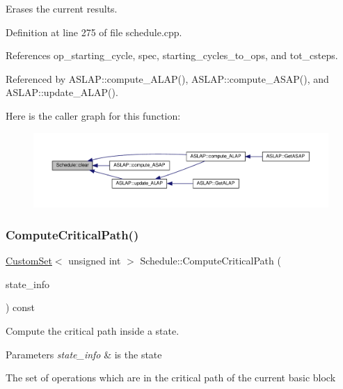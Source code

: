 Erases the current results. 



Definition at line 275 of file schedule.\+cpp.



References op\+\_\+starting\+\_\+cycle, spec, starting\+\_\+cycles\+\_\+to\+\_\+ops, and tot\+\_\+csteps.



Referenced by A\+S\+L\+A\+P\+::compute\+\_\+\+A\+L\+A\+P(), A\+S\+L\+A\+P\+::compute\+\_\+\+A\+S\+A\+P(), and A\+S\+L\+A\+P\+::update\+\_\+\+A\+L\+A\+P().

Here is the caller graph for this function\+:
\nopagebreak
\begin{figure}[H]
\begin{center}
\leavevmode
\includegraphics[width=350pt]{df/d61/classSchedule_aa94b33ccedaa82177f6a78b3fe646446_icgraph}
\end{center}
\end{figure}
\mbox{\label{classSchedule_a7ab094843958d44cf31dc83a3e0b1ec7}} 
\subsubsection{\texorpdfstring{Compute\+Critical\+Path()}{ComputeCriticalPath()}}
{\footnotesize\ttfamily \hyperlink{custom__set_8hpp_a615bc2f42fc38a4bb1790d12c759e86f}{Custom\+Set}$<$ unsigned int $>$ Schedule\+::\+Compute\+Critical\+Path (\begin{DoxyParamCaption}\item[{const \hyperlink{state__transition__graph_8hpp_a50240fded93adab729e333c2b8090a8b}{State\+Info\+Const\+Ref}}]{state\+\_\+info }\end{DoxyParamCaption}) const}



Compute the critical path inside a state. 


\begin{DoxyParams}{Parameters}
{\em state\+\_\+info} & is the state \\
\hline
\end{DoxyParams}
The set of operations which are in the critical path of the current basic block

